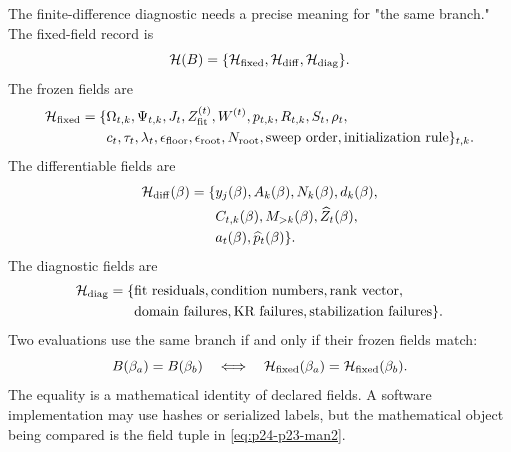 \documentclass[11pt]{article}
\numberwithin{equation}{section}
\begin{document}
The finite-difference diagnostic needs a precise meaning for "the same
branch."  The fixed-field record is
\begin{equation}
    \mathcal H(B)
    =
    \{\mathcal H_{\rm fixed},\mathcal H_{\rm diff},\mathcal H_{\rm diag}\}.
    \label{eq:p24-p23-man1}
\end{equation}
The frozen fields are
\begin{equation}
\begin{aligned}
    \mathcal H_{\rm fixed}
    =
    \{&
    \Omega_{t,k},\Psi_{t,k},J_t,
    Z_{\rm fit}^{(t)},W^{(t)},p_{t,k},R_{t,k},
    S_t,\rho_t,\\
    &c_t,\tau_t,\lambda_t,\epsilon_{\rm floor},
    \epsilon_{\rm root},N_{\rm root},
    \text{sweep order},\text{initialization rule}\}_{t,k}.
\end{aligned}
    \label{eq:p24-p23-man2}
\end{equation}
The differentiable fields are
\begin{equation}
    \begin{aligned}
    \mathcal H_{\rm diff}(\beta)
    =
    \{&
    y_j(\beta),A_k(\beta),N_k(\beta),d_k(\beta),\\
    &C_{t,k}(\beta),M_{>k}(\beta),\widehat Z_t(\beta),\\
    &a_t(\beta),\widehat p_t(\beta)\}.
    \end{aligned}
    \label{eq:p24-p23-man3}
\end{equation}
The diagnostic fields are
\begin{equation}
    \begin{aligned}
    \mathcal H_{\rm diag}
    =
    \{&
    \text{fit residuals},\text{condition numbers},\text{rank vector},\\
    &\text{domain failures},\text{KR failures},
      \text{stabilization failures}\}.
    \end{aligned}
    \label{eq:p24-p23-man4}
\end{equation}
Two evaluations use the same branch if and only if their frozen fields match:
\begin{equation}
    B(\beta_a)=B(\beta_b)
    \quad\Longleftrightarrow\quad
    \mathcal H_{\rm fixed}(\beta_a)=\mathcal H_{\rm fixed}(\beta_b).
    \label{eq:p24-p23-man5}
\end{equation}
The equality is a mathematical identity of declared fields.  A software
implementation may use hashes or serialized labels, but the mathematical
object being compared is the field tuple in \eqref{eq:p24-p23-man2}.
\end{document}
